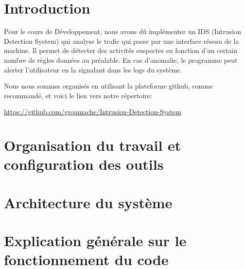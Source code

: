 \documentclass[a4paper]{article}
\begin{document}
\let\cleardoublepage\clearpage










\section{Introduction}





Pour le cours de Développement, nous avons dû implémenter un IDS (Intrusion Detection System) qui analyse le trafic qui passe par une interface réseau de la machine. Il permet de détecter des activités suspectes en fonction d'un certain nombre de règles données au préalable. En cas d'anomalie, le programme peut alerter l'utilisateur en la signalant dans les logs du système.

Nous nous sommes organisés en utilisant la plateforme github, comme recommandé, et voici le lien vers notre répertoire: 
\begin{center}
    {\small \url{https://github.com/groumache/Intrusion-Detection-System}}
\end{center}










\section{Organisation du travail et configuration des outils}















\section{Architecture du système}















\section{Explication générale sur le fonctionnement du code}
\end{document}
